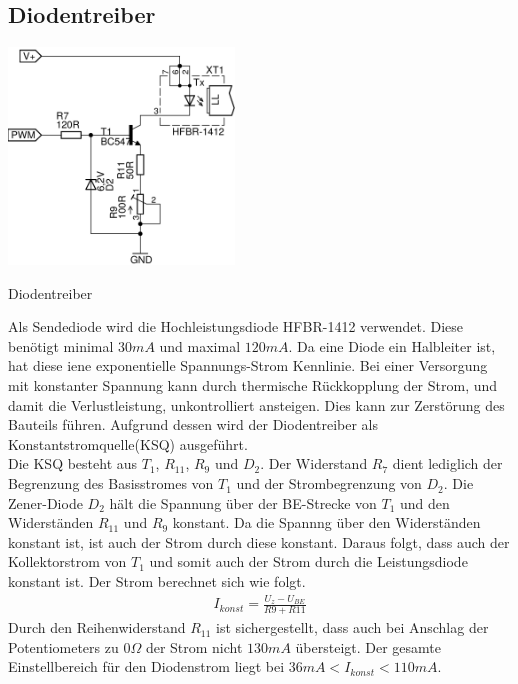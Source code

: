 \subsection{Diodentreiber}
\noindent
\begin{floatingfigure}[r]{6.5cm}
\includegraphics[width=6cm]{gfx/diodentreiber.pdf}
\caption{Diodentreiber}
\label{fig:comp}
\end{floatingfigure}
\noindent
Als Sendediode wird die Hochleistungsdiode \textsc{HFBR-1412} verwendet. Diese benötigt minimal $30mA$ und maximal $120mA$. Da eine Diode ein Halbleiter ist, hat diese iene exponentielle Span\-nungs-Strom Kennlinie. Bei einer Versorgung mit konstanter Spannung kann durch thermische Rückkopplung der Strom, und damit die Verlustleistung, unkontrolliert ansteigen. Dies kann zur Zer\-störung des Bauteils führen. Aufgrund dessen wird der Diodentreiber als Konstantstromquelle(KSQ) ausgeführt. \\
Die KSQ besteht aus $T_1$, $R_{11}$, $R_9$ und $D_2$. Der Widerstand $R_7$ dient lediglich der Begrenzung des Basisstromes von $T_1$ und der Strombegrenzung von $D_2$.
Die Zener-Diode $D_2$ hält die Spannung über der BE-Strecke von $T_1$ und den Widerständen $R_{11}$ und $R_9$ konstant. Da die Spannng über den Widerständen konstant ist, ist auch der Strom durch diese konstant. Daraus folgt, dass auch der Kollektorstrom von $T_1$ und somit auch der Strom durch die Leistungsdiode konstant ist.
Der Strom berechnet sich wie folgt.
\begin{align}
I_{konst} = \frac{U_z-U_{BE}}{R9+R11}
\end{align} 
Durch den Reihenwiderstand $R_{11}$	ist sichergestellt, dass auch bei Anschlag der Potentiometers zu $0\Omega$ der Strom nicht $130mA$ übersteigt. Der gesamte Einstellbereich für den Diodenstrom liegt bei $36mA < I_{konst}< 110mA$.
	